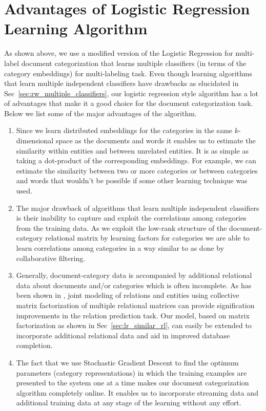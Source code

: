 \section{Advantages of Logistic Regression Learning Algorithm}
As shown above, we use a modified version of the Logistic Regression for multi-label document categorization that learns multiple classifiers (in terms of the category embeddings) for multi-labeling task. Even though learning algorithms that learn multiple independent classifiers have drawbacks as elucidated in Sec~\ref{sec:rw_multiple_classifiers}, our logistic regression style algorithm has a lot of advantages that make it a good choice for the document categorization task. Below we list some of the major advantages of the algorithm. 
\begin{enumerate}
\item 
Since we learn distributed embeddings for the categories in the same $k$-dimensional space as the documents and words it enables us to estimate the similarity within entities and between unrelated entities. It is as simple as taking a dot-product of the corresponding embeddings. For example, we can estimate the similarity between two or more categories or between categories and words that wouldn't be possible if some other learning technique was used. 

\item 
The major drawback of algorithms that learn multiple independent classifiers is their inability to capture and exploit the correlations among categories from the training data. As we exploit the low-rank structure of the document-category relational matrix by learning factors for categories we are able to learn correlations among categories in a way similar to as done by collaborative filtering.

\item 
Generally, document-category data is accompanied by additional relational data about documents and/or categories which is often incomplete. As has been shown in \cite{gupta2015collectively}, joint modeling of relations and entities using collective matrix factorization of multiple relational matrices can provide signification improvements in the relation prediction task. 
Our model, based on matrix factorization as shown in Sec~\ref{sec:lr_similar_rl}, can easily be extended to incorporate additional relational data and aid in improved database completion. 

\item 
The fact that we use Stochastic Gradient Descent to find the optimum parameters (category representations) in which the training examples are presented to the system one at a time makes our document categorization algorithm completely online. It enables us to incorporate streaming data and additional training data at any stage of the learning without any effort.  
\end{enumerate}